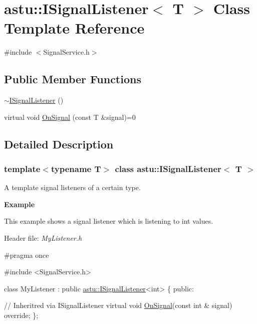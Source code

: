 \hypertarget{classastu_1_1ISignalListener}{}\section{astu\+:\+:I\+Signal\+Listener$<$ T $>$ Class Template Reference}
\label{classastu_1_1ISignalListener}


{\ttfamily \#include $<$Signal\+Service.\+h$>$}

\subsection*{Public Member Functions}
\begin{DoxyCompactItemize}
\item 
\hyperlink{classastu_1_1ISignalListener_a8656a83d9ac0775640edb97e028c3fd9}{$\sim$\+I\+Signal\+Listener} ()
\item 
virtual void \hyperlink{classastu_1_1ISignalListener_abc538ead0f63533bc60ba0f931b2a5ce}{On\+Signal} (const T \&signal)=0
\end{DoxyCompactItemize}


\subsection{Detailed Description}
\subsubsection*{template$<$typename T$>$\newline
class astu\+::\+I\+Signal\+Listener$<$ T $>$}

A template signal listeners of a certain type.

{\bfseries Example}

This example shows a signal listener which is listening to {\ttfamily int} values.

Header file\+: {\itshape My\+Listener.\+h} 
\begin{DoxyCode}
\textcolor{preprocessor}{#pragma once}

\textcolor{preprocessor}{#include <SignalService.h>}

\textcolor{keyword}{class }MyListener : \textcolor{keyword}{public} \hyperlink{classastu_1_1ISignalListener}{astu::ISignalListener}<int> \{
\textcolor{keyword}{public}:

  \textcolor{comment}{// Inheritred via ISignalListener}
  \textcolor{keyword}{virtual} \textcolor{keywordtype}{void} \hyperlink{classastu_1_1ISignalListener_abc538ead0f63533bc60ba0f931b2a5ce}{OnSignal}(\textcolor{keyword}{const} \textcolor{keywordtype}{int} & signal) \textcolor{keyword}{override};    
\};
\end{DoxyCode}


